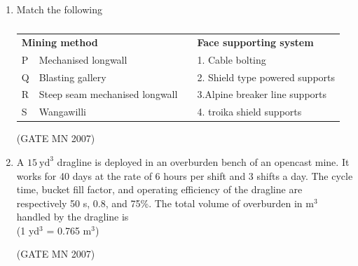 \documentclass[journal]{IEEEtran}
\begin{document}
\begin{enumerate}
\item Match the following
\begin{table}[H]
    \centering\normalsize
\begin{tabular}{llcl}                             
\multicolumn{2}{l}{\textbf{Mining method    }} & & \textbf{Face supporting system} \\                       
P & Mechanised longwall     &  & 1. Cable bolting \\     
Q & Blasting gallery    &  & 2. Shield type powered supports \\                         
R & Steep seam mechanised longwall        &  & 3.Alpine breaker line supports     \\                                               
S & Wangawilli   &  & 4. troika shield supports \\                                          
\end{tabular}
\caption*{}
    \label{tab:Q34}
\end{table}
\hfill (GATE MN 2007)
\begin{enumerate}
\end{enumerate}



\item A $15 \ \text{yd}^3$ dragline is deployed in an overburden bench of an opencast mine. It works for 40 days at the rate of 6 hours per shift and 3 shifts a day. The cycle time, bucket fill factor, and operating efficiency of the dragline are respectively 50 s, 0.8, and 75\%. The total volume of overburden in m$^3$ handled by the dragline is \\
(1 yd$^3$ = 0.765 m$^3$)

\hfill (GATE MN 2007)
\begin{enumerate}
\end{enumerate}




\end{enumerate}
\end{document}
